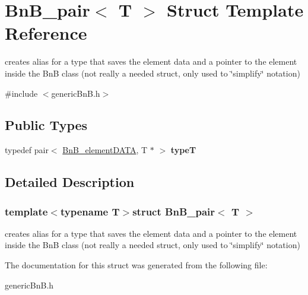 \hypertarget{struct_bn_b__pair}{}\section{Bn\+B\+\_\+pair$<$ T $>$ Struct Template Reference}
\label{struct_bn_b__pair}


creates alias for a type that saves the element data and a pointer to the element inside the Bn\+B class (not really a needed struct, only used to \char`\"{}simplify\char`\"{} notation)  




{\ttfamily \#include $<$generic\+Bn\+B.\+h$>$}

\subsection*{Public Types}
\begin{DoxyCompactItemize}
\item 
\hypertarget{struct_bn_b__pair_a1fc06192d7cc8297619806b35f452a6d}{}typedef pair$<$ \hyperlink{struct_bn_b__element_d_a_t_a}{Bn\+B\+\_\+element\+D\+A\+T\+A}, T $\ast$ $>$ {\bfseries type\+T}\label{struct_bn_b__pair_a1fc06192d7cc8297619806b35f452a6d}

\end{DoxyCompactItemize}


\subsection{Detailed Description}
\subsubsection*{template$<$typename T$>$struct Bn\+B\+\_\+pair$<$ T $>$}

creates alias for a type that saves the element data and a pointer to the element inside the Bn\+B class (not really a needed struct, only used to \char`\"{}simplify\char`\"{} notation) 

The documentation for this struct was generated from the following file\+:\begin{DoxyCompactItemize}
\item 
generic\+Bn\+B.\+h\end{DoxyCompactItemize}
